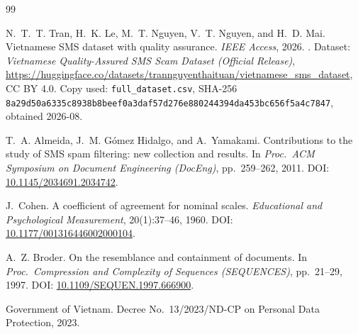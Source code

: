 \begin{thebibliography}{99}

N.~T.~T. Tran, H.~K. Le, M.~T. Nguyen, V.~T. Nguyen, and H.~D. Mai. Vietnamese SMS dataset
with quality assurance. \emph{IEEE Access}, 2026. . Dataset:
\emph{Vietnamese Quality-Assured SMS Scam Dataset (Official Release)},
\url{https://huggingface.co/datasets/trannguyenthaituan/vietnamese_sms_dataset}, CC BY 4.0.
Copy used: \texttt{full\_dataset.csv}, SHA-256
\texttt{8a29d50a6335c8938b8beef0a3daf57d276e880244394da453bc656f5a4c7847}, obtained 2026-08.


T.~A. Almeida, J.~M. G\'omez Hidalgo, and A.~Yamakami. Contributions to the study of SMS spam
filtering: new collection and results. In \emph{Proc.\ ACM Symposium on Document Engineering
(DocEng)}, pp.~259--262, 2011. DOI:
\href{https://doi.org/10.1145/2034691.2034742}{10.1145/2034691.2034742}. 

J.~Cohen. A coefficient of agreement for nominal scales. \emph{Educational and Psychological
Measurement}, 20(1):37--46, 1960. DOI:
\href{https://doi.org/10.1177/001316446002000104}{10.1177/001316446002000104}.

A.~Z. Broder. On the resemblance and containment of documents. In \emph{Proc.\ Compression and
Complexity of Sequences (SEQUENCES)}, pp.~21--29, 1997. DOI:
\href{https://doi.org/10.1109/SEQUEN.1997.666900}{10.1109/SEQUEN.1997.666900}.


Government of Vietnam. Decree No.~13/2023/ND-CP on Personal Data Protection, 2023.

\end{thebibliography}
